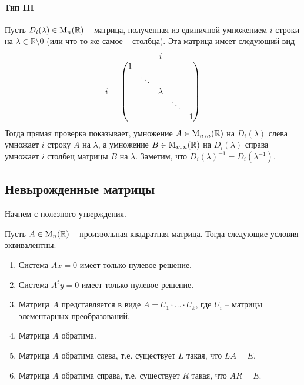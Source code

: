 \paragraph{Тип III}

Пусть $D_i(\lambda)\in\operatorname{M}_{n}(\mathbb R)$ -- матрица, полученная из единичной умножением $i$ строки на $\lambda\in\mathbb R\setminus 0$ (или что то же самое -- столбца).
Эта матрица имеет следующий вид
\[
\begin{tabular}{cc}
{}&{$i$}\\
{
$
\begin{matrix}
{}\\{}\\{i}\\{}\\{}
\end{matrix}
$}&{
$
\begin{pmatrix}
{1}&{}&{}&{}&{}\\
{}&{\ddots}&{}&{}&{}\\
{}&{}&{\lambda}&{}&{}\\
{}&{}&{}&{\ddots}&{}\\
{}&{}&{}&{}&{1}\\
\end{pmatrix}
$
}
\end{tabular}
\]
Тогда прямая проверка показывает, умножение $A\in\operatorname{M}_{n\,m}(\mathbb R)$ на $D_i(\lambda)$ слева умножает $i$ строку $A$ на $\lambda$, а умножение $B\in\operatorname{M}_{m\,n}(\mathbb R)$ на $D_i(\lambda)$ справа умножает $i$ столбец матрицы $B$ на $\lambda$.
Заметим, что $D_i(\lambda)^{-1}= D_i(\lambda^{-1})$.

\subsection{Невырожденные матрицы}

Начнем с полезного утверждения.

\begin{claim}
\label{claim::InvertibleDiscription}
Пусть $A\in\operatorname{M}_{n}(\mathbb R)$ -- произвольная квадратная матрица.
Тогда следующие условия эквивалентны:
\begin{enumerate}
\item Система $Ax = 0$ имеет только нулевое решение.

\item Система $A^ty = 0$ имеет только нулевое решение.

\item Матрица $A$ представляется в виде $A = U_1\cdot \ldots \cdot U_k$, где $U_i$ -- матрицы элементарных преобразований.

\item Матрица $A$ обратима.

\item Матрица $A$ обратима слева, т.е. существует $L$ такая, что $LA = E$.

\item Матрица $A$ обратима справа, т.е. существует $R$ такая, что $AR = E$.
\end{enumerate}
\end{claim}

